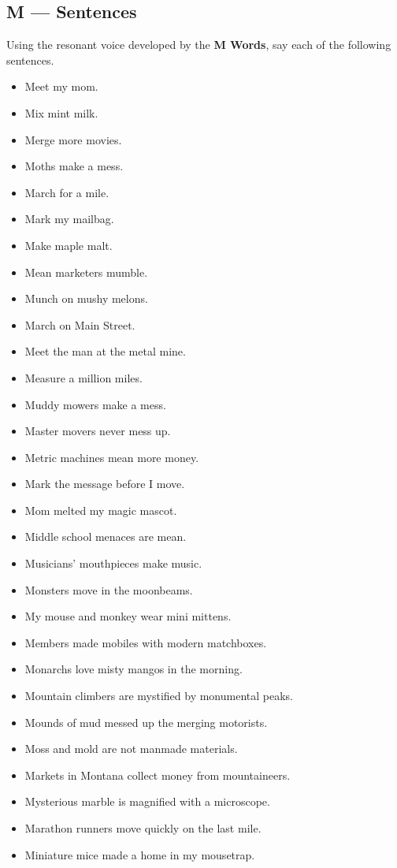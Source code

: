 \documentclass[12pt]{article}
\begin{document}
\pagebreak
\subsection*{M --- Sentences}
Using the resonant voice developed by the \textbf{M Words}, say each of the following sentences.
\begin{itemize}
\item Meet my mom.
\item Mix mint milk.
\item Merge more movies.
\item Moths make a mess.
\item March for a mile.
\item Mark my mailbag.
\item Make maple malt.
\item Mean marketers mumble.
\item Munch on mushy melons.
\item March on Main Street.
\item Meet the man at the metal mine.
\item Measure a million miles.
\item Muddy mowers make a mess.
\item Master movers never mess up.
\item Metric machines mean more money.
\item Mark the message before I move.
\item Mom melted my magic mascot.
\item Middle school menaces are mean.
\item Musicians' mouthpieces make music.
\item Monsters move in the moonbeams.
\item My mouse and monkey wear mini mittens.
\item Members made mobiles with modern matchboxes.
\item Monarchs love misty mangos in the morning.
\item Mountain climbers are mystified by monumental peaks.
\item Mounds of mud messed up the merging motorists.
\item Moss and mold are not manmade materials.
\item Markets in Montana collect money from mountaineers.
\item Mysterious marble is magnified with a microscope.
\item Marathon runners move quickly on the last mile.
\item Miniature mice made a home in my mousetrap.
\end{itemize}
\end{document}
